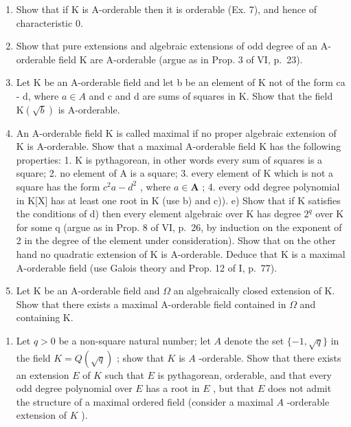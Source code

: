 \begin{enumerate}
\def\labelenumi{\alph{enumi})}
\item
  Show that if K is A-orderable then it is orderable (Ex. 7), and hence of characteristic 0.
\item
  Show that pure extensions and algebraic extensions of odd degree of an A-orderable field K are A-orderable (argue as in Prop. 3 of VI, p.~23).
\item
  Let K be an A-orderable field and let b be an element of K not of the form ca - d, where \(a \in A\) and c and d are sums of squares in K. Show that the field \(\mathrm{K}(\sqrt{b})\) is A-orderable.
\item
  An A-orderable field K is called maximal if no proper algebraic extension of K is A-orderable. Show that a maximal A-orderable field K has the following properties: 1. K is pythagorean, in other words every sum of squares is a square; 2. no element of A is a square; 3. every element of K which is not a square has the form \(c^2 a - d^2\) , where \(a \in \mathbf{A}\) ; 4. every odd degree polynomial in K{[}X{]} has at least one root in K (use b) and c)). e) Show that if K satisfies the conditions of d) then every element algebraic over K has degree \(2^q\) over K for some q (argue as in Prop. 8 of VI, p.~26, by induction on the exponent of 2 in the degree of the element under consideration). Show that on the other hand no quadratic extension of K is A-orderable. Deduce that K is a maximal A-orderable field (use Galois theory and Prop. 12 of I, p.~77).
\item
  Let K be an A-orderable field and \(\Omega\) an algebraically closed extension of K. Show that there exists a maximal A-orderable field contained in \(\Omega\) and containing K.
\end{enumerate}

\begin{enumerate}
\def\labelenumi{\arabic{enumi})}
\setcounter{enumi}{8}
\tightlist
\item
  Let \(q > 0\) be a non-square natural number; let \(A\) denote the set \(\{-1, \sqrt{q}\}\) in the field \(K = Q(\sqrt{q})\) ; show that \(K\) is \(A\) -orderable. Show that there exists an extension \(E\) of \(K\) such that \(E\) is pythagorean, orderable, and that every odd degree polynomial over \(E\) has a root in \(E\) , but that \(E\) does not admit the structure of a maximal ordered field (consider a maximal \(A\) -orderable extension of \(K\) ).
\end{enumerate}

